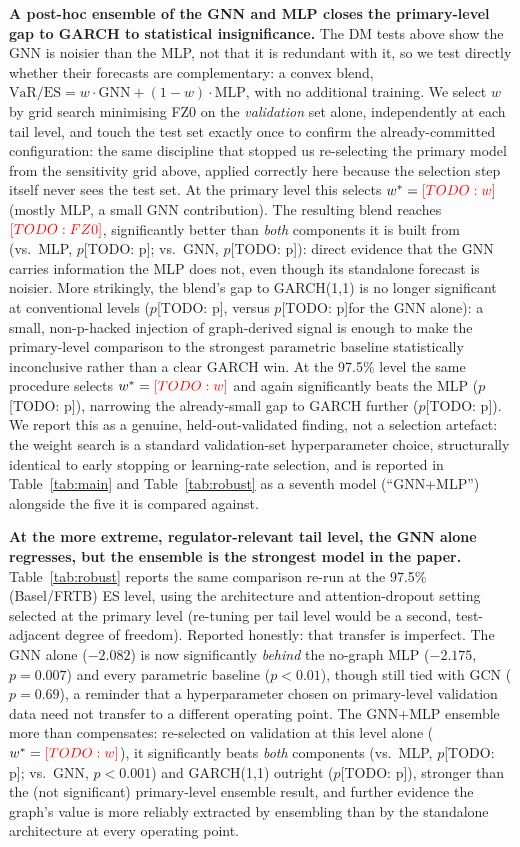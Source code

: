 \documentclass{llncs}
\newcommand{\todo}[1]{{\color{red}[TODO: #1]}}
\newcommand{\dmGarchP}{\todo{p}}
\newcommand{\blendW}{\todo{w}}
\newcommand{\blendFZ}{\todo{FZ0}}
\newcommand{\blendVsMlpP}{\todo{p}}
\newcommand{\blendVsGnnP}{\todo{p}}
\newcommand{\blendVsGarchP}{\todo{p}}
\newcommand{\blendWtwo}{\todo{w}}
\newcommand{\blendVsMlpPtwo}{\todo{p}}
\newcommand{\blendVsGarchPtwo}{\todo{p}}
\begin{document}
\textbf{A post-hoc ensemble of the GNN and MLP closes the primary-level gap to
GARCH to statistical insignificance.} The DM tests above show the GNN is
noisier than the MLP, not that it is redundant with it, so we test directly
whether their forecasts are complementary: a convex blend,
$\mathrm{VaR}/\mathrm{ES} = w\cdot\text{GNN} + (1-w)\cdot\text{MLP}$, with no
additional training. We select $w$ by grid search minimising FZ0 on the
\emph{validation} set alone, independently at each tail level, and touch the
test set exactly once to confirm the already-committed configuration: the
same discipline that stopped us re-selecting the primary model from the
sensitivity grid above, applied correctly here because the selection step
itself never sees the test set. At the primary level this selects
$w^\ast=\blendW$ (mostly MLP, a small GNN contribution). The resulting blend
reaches $\blendFZ$, significantly better than \emph{both} components it is
built from (vs.\ MLP, $p$\blendVsMlpP; vs.\ GNN, $p$\blendVsGnnP): direct
evidence that the GNN carries information the MLP does not, even though its
standalone forecast is noisier. More strikingly, the blend's gap to
GARCH(1,1) is no longer significant at conventional levels ($p$\blendVsGarchP,
versus $p$\dmGarchP for the GNN alone): a small, non-p-hacked injection of
graph-derived signal is enough to make the primary-level comparison to the
strongest parametric baseline statistically inconclusive rather than a clear
GARCH win. At the 97.5\% level the same procedure selects $w^\ast=\blendWtwo$
and again significantly beats the MLP ($p$\blendVsMlpPtwo), narrowing the
already-small gap to GARCH further ($p$\blendVsGarchPtwo). We report this as
a genuine, held-out-validated finding, not a selection artefact: the weight
search is a standard validation-set hyperparameter choice, structurally
identical to early stopping or learning-rate selection, and is reported in
Table~\ref{tab:main} and Table~\ref{tab:robust} as a seventh model
(``GNN+MLP'') alongside the five it is compared against.

\textbf{At the more extreme, regulator-relevant tail level, the GNN alone
regresses, but the ensemble is the strongest model in the paper.} Table~\ref{tab:robust}
reports the same comparison re-run at the 97.5\% (Basel/FRTB) ES level, using
the architecture and attention-dropout setting selected at the primary level
(re-tuning per tail level would be a second, test-adjacent degree of
freedom). Reported honestly: that transfer is imperfect. The GNN alone
($-2.082$) is now significantly \emph{behind} the no-graph MLP ($-2.175$,
$p=0.007$) and every parametric baseline ($p<0.01$), though still tied with
GCN ($p=0.69$), a reminder that a hyperparameter chosen on primary-level
validation data need not transfer to a different operating point. The
GNN+MLP ensemble more than compensates: re-selected on validation at this
level alone ($w^\ast=\blendWtwo$), it significantly beats \emph{both}
components (vs.\ MLP, $p$\blendVsMlpPtwo; vs.\ GNN, $p<0.001$) and
GARCH(1,1) outright ($p$\blendVsGarchPtwo), stronger than the (not
significant) primary-level ensemble result, and further evidence the graph's
value is more reliably extracted by ensembling than by the standalone
architecture at every
operating point.
\end{document}
